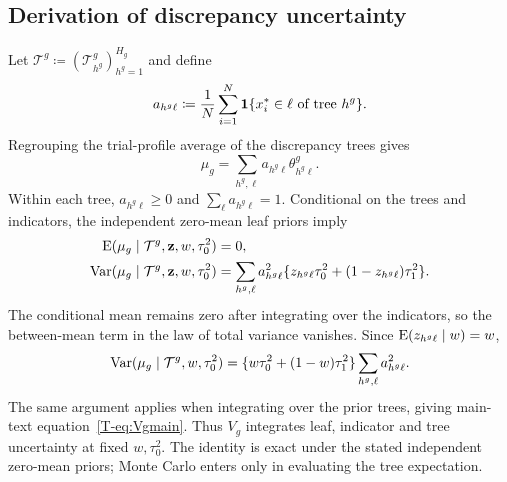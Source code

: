 \subsection{Derivation of discrepancy uncertainty}\label{sec:B.3}
Let $\mathcal T^g\coloneqq(\mathcal T_{h^g}^g)_{h^g=1}^{H_g}$ and define
\begin{equation}\label{eq:weights}
a_{h^g\ell}\coloneqq
\frac1{N}\sum_{i=1}^{N}
\mathbf{1}\{x_i^*\in\ell\text{ of tree }h^g\}.
\end{equation}
Regrouping the trial-profile average of the discrepancy trees gives
\begin{equation}
\mu_g=\sum_{h^g,\ell}a_{h^g\ell}\theta^g_{h^g\ell}.
\end{equation}
Within each tree, $a_{h^g\ell}\geq0$ and $\sum_\ell a_{h^g\ell}=1$. Conditional on the trees and indicators, the independent zero-mean leaf priors imply
\begin{equation}\label{eq:conditionalVg}
\begin{aligned}
\operatorname{E}(\mu_g\mid\mathcal T^g,\mathbf z,w,\tau_0^2)&=0,\\
\operatorname{Var}(\mu_g\mid\mathcal T^g,\mathbf z,w,\tau_0^2)
&=\sum_{h^g,\ell}a_{h^g\ell}^2
\{z_{h^g\ell}\tau_0^2+(1-z_{h^g\ell})\tau_1^2\}.
\end{aligned}
\end{equation}
The conditional mean remains zero after integrating over the indicators, so the between-mean term in the law of total variance vanishes. Since $\operatorname{E}(z_{h^g\ell}\mid w)=w$,
\[
\operatorname{Var}(\mu_g\mid\mathcal T^g,w,\tau_0^2)
=\{w\tau_0^2+(1-w)\tau_1^2\}
\sum_{h^g,\ell}a_{h^g\ell}^2.
\]
The same argument applies when integrating over the prior trees, giving main-text equation~\ref{T-eq:Vgmain}. Thus $V_g$ integrates leaf, indicator and tree uncertainty at fixed $w,\tau_0^2$. The identity is exact under the stated independent zero-mean priors; Monte Carlo enters only in evaluating the tree expectation.


